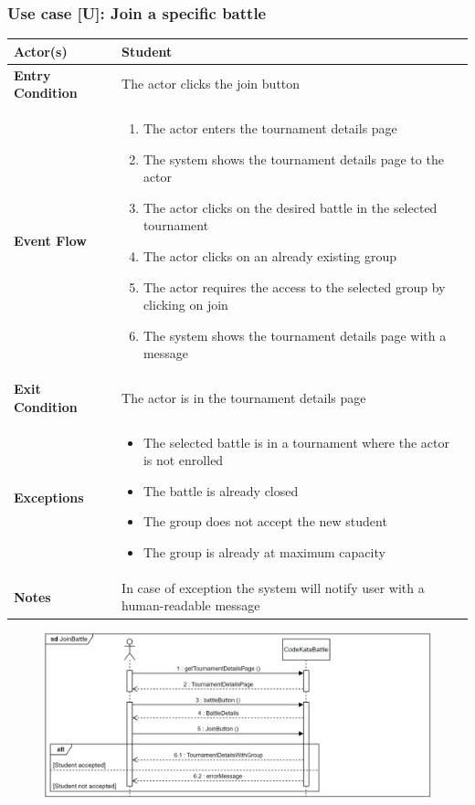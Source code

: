 \documentclass[12pt, a4paper]{report}
\newcounter{useCase}
\newcommand{\usecase}[9]{
    \def\arraystretch{1.5} 
    \subsubsection*{Use case [U#2]: #3}
    \vspace*{0.2cm}
    \begin{center}
        \begin{tabular}{|l|p{12cm}|}
            \hline
            \textbf{Actor(s)} & #4 \\
            \hline
            \textbf{Entry Condition} & #5 \\
            \hline
            \textbf{Event Flow} & #6 \\
            \hline
            \textbf{Exit Condition} & #7 \\
            \hline
            \textbf{Exceptions} & #8 \\
            \hline
            \textbf{Notes} & #9 \\
            \hline
        \end{tabular}
    \end{center}
    #1
}
\begin{document}
        \usecase{\begin{figure}[H]\centering\includegraphics[width=0.9\linewidth]{images/joinbattle1.png}\end{figure}}        
        {\arabic{useCase}\stepcounter{useCase}}
        {Join a specific battle}
        {Student}
        {The actor clicks the join button}
        {
        \begin{enumerate}
            \item The actor enters the tournament details page
            \item The system shows the tournament details page to the actor
            \item The actor clicks on the desired battle in the selected tournament
            \item The actor clicks on an already existing group
            \item The actor requires the access to the selected group by clicking on join
            \item The system shows the tournament details page with a message
        \end{enumerate}
        }
        {The actor is in the tournament details page}
        {
        \begin{itemize}
            \item The selected battle is in a tournament where the actor is not enrolled
            \item The battle is already closed
            \item The group does not accept the new student
            \item The group is already at maximum capacity
        \end{itemize}
        }
        {In case of exception the system will notify user with a human-readable message}
\end{document}
